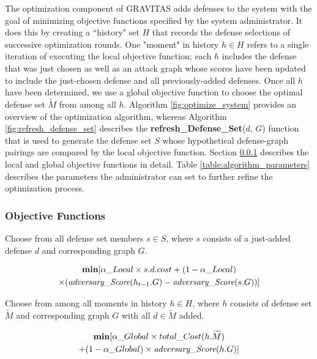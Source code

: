 \documentclass[10pt,journal,compsoc]{IEEEtran}
\begin{document}
The optimization component of GRAVITAS adds defenses to the system with the goal of minimizing 
objective functions specified by the system administrator. It does this by creating a
``history"  set $H$ that records the defense selections of successive optimization rounds. One "moment" in history $h \in H$ refers to a single iteration of executing the local objective function; each $h$ includes the defense that was just chosen as well as an attack graph whose scores have been updated to include the just-chosen defense and all previously-added defenses. Once all $h$ have been determined, we use a global objective function to choose the optimal defense set $\widetilde{M}$ from among all $h$.
Algorithm \ref{fig:optimize_system} provides an overview of the optimization algorithm, whereas 
Algorithm \ref{fig:refresh_defense_set} describes the \textbf{refresh\_Defense\_Set}($d$, $G$) 
function that is used to generate the defense set $S$ whose hypothetical defense-graph pairings are compared by the local objective function. 
Section \ref{subsubsection:objective_functions} describes the local and global objective functions in 
detail. Table \ref{table:algorithm_parameters} describes the parameters the administrator can set to further refine the optimization process.

\subsubsection{Objective Functions}
\label{subsubsection:objective_functions}

\begin{flushleft} \small
Choose from all defense set members $s \in S$, where $s$ consists of a just-added defense $d$ and 
corresponding graph $G$.
\end{flushleft}
\begin{equation}
\label{eqn:local_function}
\begin{gathered}
\textbf{min}[\alpha\_Local \times s.d.cost+(1-\alpha\_Local) \\ \times (\emph{adversary\_Score}(h_{t-1}.G) - \emph{adversary\_Score}(s.G))]
\end{gathered}
\end{equation}

\begin{flushleft} \small
Choose from among all moments in history $h \in H$, where $h$ consists of defense set 
$\widetilde{M}$ and corresponding graph $G$ with all $d \in \widetilde{M}$ added.
\end{flushleft}
\begin{equation}
\label{eqn:global_function}
\begin{gathered}
\textbf{min}[\alpha\_Global \times total\_Cost( h.\widetilde{M}) \\ + (1-\alpha\_Global)\times \emph{adversary\_Score}(h.G)]
\end{gathered}
\end{equation}
\end{document}
